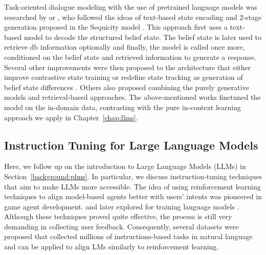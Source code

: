 Task-oriented dialogue modeling with the use of pretrained language models was researched by \citet{zhang2019dialogpt} or \citet{peng-etal-2021-soloist}, who followed the ideas of text-based state encoding and 2-stage generation proposed in the Sequicity model \cite{lei2018sequicity}.
This approach first uses a text-based model to decode the structured belief state.
The belief state is later used to retrieve db information optionally and finally, the model is called once more, conditioned on the belief state and retrieved information to generate a response.
Several other improvements were then proposed to the architecture that either improve contrastive state training \cite{kulhanek-etal-2021-augpt} or redefine state tracking as generation of belief state differences \cite{lin-etal-2020-mintl}.
Others also proposed combining the purely generative models and retrieval-based approaches\cite{pandey-etal-2018-exemplar,cai-etal-2019-retrieval,nekvinda-dusek-2022-aargh}.
The above-mentioned works finetuned the model on the in-domain data, contrasting with the pure in-context learning approach we apply in Chapter~\ref{chap:llms}.


\subsection{Instruction Tuning for Large Language Models}
Here, we follow up on the introduction to Large Language Models (LLMs) in Section~\ref{background:plms}.
In particular, we discuss instruction-tuning techniques that aim to make LLMs more accessible. 
The idea of using reinforcement learning techniques to align model-based agents better with users' intents was pioneered in game agent development. \cite{christiano2017deep} and later explored for training language models \cite{ziegler2019fine,ouyang2022training}.
Although these techniques proved quite effective, the process is still very demanding in collecting user feedback.
Consequently, several datasets were proposed \cite{supernaturalinstructions,iyer2022opt,black2022gpt} that collected millions of instructions-based tasks in natural language and can be applied to align LMs similarly to reinforcement learning.

